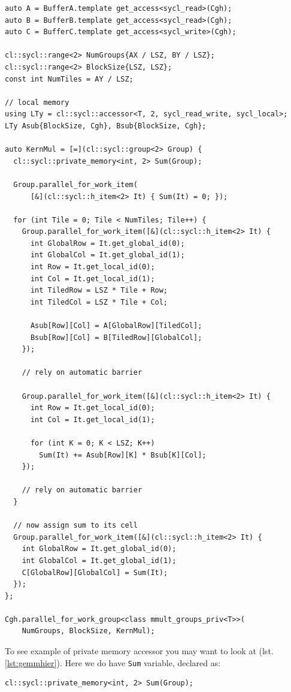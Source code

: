 \documentclass[a4paper,12pt,oneside]{article}
\begin{document}
\begin{lstlisting}[caption={Hierarchial GEMM with private memory},label={lst:gemmhier}]
auto A = BufferA.template get_access<sycl_read>(Cgh);
auto B = BufferB.template get_access<sycl_read>(Cgh);
auto C = BufferC.template get_access<sycl_write>(Cgh);

cl::sycl::range<2> NumGroups{AX / LSZ, BY / LSZ};
cl::sycl::range<2> BlockSize{LSZ, LSZ};
const int NumTiles = AY / LSZ;

// local memory
using LTy = cl::sycl::accessor<T, 2, sycl_read_write, sycl_local>;
LTy Asub{BlockSize, Cgh}, Bsub{BlockSize, Cgh};

auto KernMul = [=](cl::sycl::group<2> Group) {
  cl::sycl::private_memory<int, 2> Sum(Group);

  Group.parallel_for_work_item(
      [&](cl::sycl::h_item<2> It) { Sum(It) = 0; });

  for (int Tile = 0; Tile < NumTiles; Tile++) {
    Group.parallel_for_work_item([&](cl::sycl::h_item<2> It) {
      int GlobalRow = It.get_global_id(0);
      int GlobalCol = It.get_global_id(1);
      int Row = It.get_local_id(0);
      int Col = It.get_local_id(1);
      int TiledRow = LSZ * Tile + Row;
      int TiledCol = LSZ * Tile + Col;

      Asub[Row][Col] = A[GlobalRow][TiledCol];
      Bsub[Row][Col] = B[TiledRow][GlobalCol];
    });

    // rely on automatic barrier

    Group.parallel_for_work_item([&](cl::sycl::h_item<2> It) {
      int Row = It.get_local_id(0);
      int Col = It.get_local_id(1);

      for (int K = 0; K < LSZ; K++)
        Sum(It) += Asub[Row][K] * Bsub[K][Col];
    });

    // rely on automatic barrier
  }

  // now assign sum to its cell
  Group.parallel_for_work_item([&](cl::sycl::h_item<2> It) {
    int GlobalRow = It.get_global_id(0);
    int GlobalCol = It.get_global_id(1);
    C[GlobalRow][GlobalCol] = Sum(It);
  });
};

Cgh.parallel_for_work_group<class mmult_groups_priv<T>>(
    NumGroups, BlockSize, KernMul);
\end{lstlisting}

To see example of private memory accessor you may want to look at (lst. \ref{lst:gemmhier}). Here we do have \lstinline!Sum! variable, declared as:

\begin{lstlisting}
cl::sycl::private_memory<int, 2> Sum(Group);
\end{lstlisting}
\end{document}
